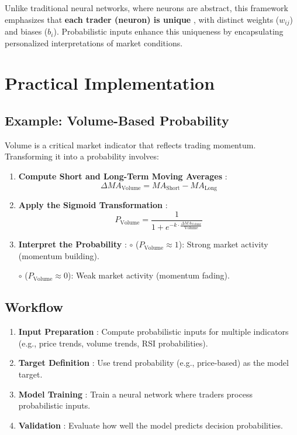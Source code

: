\documentclass[a4]{article}
\begin{document}
Unlike traditional neural networks, where neurons are abstract, this framework emphasizes that {\bf each trader (neuron) is unique} , with distinct weights ($w_{ij}$) and biases ($b_i$). Probabilistic inputs enhance this uniqueness by encapsulating personalized interpretations of market conditions.



\section{Practical Implementation}

\subsection{Example: Volume-Based Probability}

Volume is a critical market indicator that reflects trading momentum. Transforming it into a probability involves:

\begin{enumerate}[1.]
\item {\bf Compute Short and Long-Term Moving Averages} :
   $$
   \Delta MA_{\text{Volume}} = MA_{\text{Short}} - MA_{\text{Long}}
  $$

\item  {\bf Apply the Sigmoid Transformation} :
$$
   P_{\text{Volume}} = \frac{1}{1 + e^{\displaystyle -k \cdot \frac{\Delta MA_{\text{Volume}}}{\text{Volume}}}}
$$

\item {\bf Interpret the Probability} :
   $\circ$  ($P_{\text{Volume}} \approx 1$): Strong market activity (momentum building).
   
   $\circ$ ($P_{\text{Volume}} \approx 0$): Weak market activity (momentum fading).
\end{enumerate}

\subsection{Workflow}

\begin{enumerate}[1.]
\item  {\bf Input Preparation} : Compute probabilistic inputs for multiple indicators (e.g., price trends, volume trends, RSI probabilities).
\item  {\bf Target Definition} : Use trend probability (e.g., price-based) as the model target.
\item  {\bf Model Training} : Train a neural network where traders process probabilistic inputs.
\item  {\bf Validation} : Evaluate how well the model predicts decision probabilities.
\end{enumerate}
\end{document}
